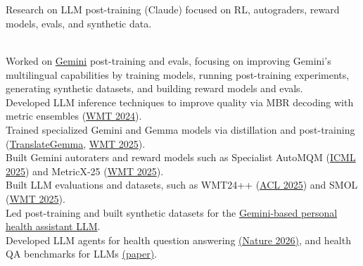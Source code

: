 \vspace{-2mm}



\\

\vspace{1mm}


\\
Research on LLM post-training (Claude) focused on RL, autograders, reward models, evals, and synthetic data.\\

\vspace{-1mm}

\\
Worked on \href{https://arxiv.org/pdf/2507.06261}{Gemini} post-training and evals, focusing on improving Gemini's multilingual capabilities by training models, running post-training experiments, generating synthetic datasets, and building reward models and evals.\\
Developed LLM inference techniques to improve quality via MBR decoding with metric ensembles (\href{https://aclanthology.org/2024.wmt-1.109.pdf}{WMT 2024}).\\
Trained specialized Gemini and Gemma models via distillation and post-training (\href{https://arxiv.org/pdf/2601.09012}{TranslateGemma}, \href{https://aclanthology.org/2025.wmt-1.48.pdf}{WMT 2025}).\\
Built Gemini autoraters and reward models such as Specialist AutoMQM (\href{https://openreview.net/pdf?id=Y0Kxvmjkmh}{ICML 2025}) and MetricX-25 (\href{https://aclanthology.org/2025.wmt-1.70.pdf}{WMT 2025}).\\
Built LLM evaluations and datasets, such as WMT24++ (\href{https://aclanthology.org/2025.findings-acl.634.pdf}{ACL 2025}) and SMOL (\href{https://aclanthology.org/2025.wmt-1.85.pdf}{WMT 2025}).\\
Led post-training and built synthetic datasets for the \href{https://research.google/blog/how-we-are-building-the-personal-health-coach/}{Gemini-based personal health assistant LLM}.\\
Developed LLM agents for health question answering \href{https://www.nature.com/articles/s41467-025-67922-y_reference.pdf}{(Nature 2026)}, and health QA benchmarks for LLMs \href{https://arxiv.org/pdf/2305.15525}{(paper)}.\\

